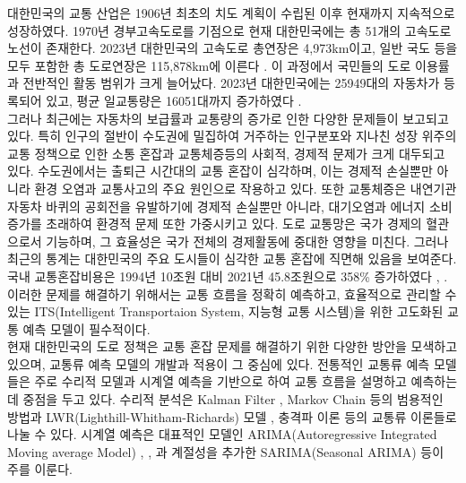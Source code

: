\documentclass[11pt]{report}
\begin{document}
대한민국의 교통 산업은 1906년 최초의 치도 계획이 수립된 이후 현재까지 지속적으로 성장하였다. 
1970년 경부고속도로를 기점으로 현재 대한민국에는 총 51개의 고속도로 노선이 존재한다. 
2023년 대한민국의 고속도로 총연장은 4,973km이고, 일반 국도 등을 모두 포함한 총 도로연장은 115,878km에 이른다 \cite{2023_road_status_report}. 
이 과정에서 국민들의 도로 이용률과 전반적인 활동 범위가 크게 늘어났다. 
2023년 대한민국에는 25949대의 자동차가 등록되어 있고, 평균 일교통량은 16051대까지 증가하였다 \cite{2023_road_traffic_survey}. \\
\indent 그러나 최근에는 자동차의 보급률과 교통량의 증가로 인한 다양한 문제들이 보고되고 있다. 
특히 인구의 절반이 수도권에 밀집하여 거주하는 인구분포와 지나친 성장 위주의 교통 정책으로 인한 소통 혼잡과 교통체증등의 사회적, 경제적 문제가 크게 대두되고 있다. 
수도권에서는 출퇴근 시간대의 교통 혼잡이 심각하며, 이는 경제적 손실뿐만 아니라 환경 오염과 교통사고의 주요 원인으로 작용하고 있다. 
또한 교통체증은 내연기관 자동차 바퀴의 공회전을 유발하기에 경제적 손실뿐만 아니라, 대기오염과 에너지 소비 증가를 초래하여 환경적 문제 또한 가중시키고 있다. 
도로 교통망은 국가 경제의 혈관으로서 기능하며, 그 효율성은 국가 전체의 경제활동에 중대한 영향을 미친다. 
그러나 최근의 통계는 대한민국의 주요 도시들이 심각한 교통 혼잡에 직면해 있음을 보여준다. 
국내 교통혼잡비용은 1994년 10조원 대비 2021년 45.8조원으로 358\% 증가하였다 \cite{1994_2012_traffic_cost}, \cite{2013_2021_traffic_cost}. 
이러한 문제를 해결하기 위해서는 교통 흐름을 정확히 예측하고, 효율적으로 관리할 수 있는 ITS(Intelligent Transportaion System, 지능형 교통 시스템)을 위한 고도화된 교통 예측 모델이 필수적이다. \\
\indent 현재 대한민국의 도로 정책은 교통 혼잡 문제를 해결하기 위한 다양한 방안을 모색하고 있으며, 교통류 예측 모델의 개발과 적용이 그 중심에 있다. 
전통적인 교통류 예측 모델들은 주로 수리적 모델과 시계열 예측을 기반으로 하여 교통 흐름을 설명하고 예측하는 데 중점을 두고 있다. 
수리적 분석은 Kalman Filter \cite{10.1115/1.3662552}, Markov Chain \cite{chain} 등의 범용적인 방법과 LWR(Lighthill-Whitham-Richards) 모델 \cite{lighthill1955kinematic}, 충격파 이론 \cite{richards1956shock} 등의 
교통류 이론들로 나눌 수 있다. 시계열 예측은 대표적인 모델인 ARIMA(Autoregressive Integrated Moving average Model) \cite{box2015time}, \cite{Combining-kohonen-maps-with-arima-time-series-models-to-forecast-traffic-flow}, 
\cite{5690910} 과 계절성을 추가한 SARIMA(Seasonal ARIMA) \cite{kumarShorttermTrafficFlow2015} 등이 주를 이룬다. 
\end{document}
